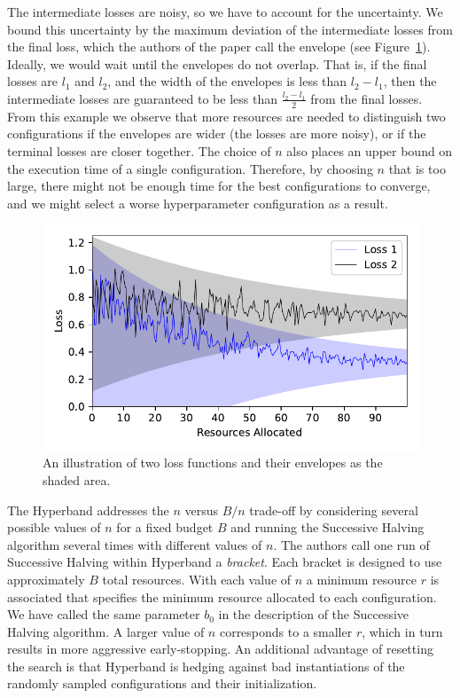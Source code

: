 The intermediate losses are noisy, so we have to account for the uncertainty. We bound this uncertainty by the maximum deviation of the intermediate losses from the final loss, which the authors of the paper call the envelope (see Figure~\ref{fig:envelopes}). Ideally, we would wait until the envelopes do not overlap. That is, if the final losses are $l_1$ and $l_2$, and the width of the envelopes is less than $l_2-l_1$, then the intermediate losses are guaranteed to be less than $\frac{l_2-l_1}{2}$ from the final losses. From this example we observe that more resources are needed to distinguish two configurations if the envelopes are wider (the losses are more noisy), or if the terminal losses are closer together. The choice of $n$ also places an upper bound on the execution time of a single configuration. Therefore, by choosing $n$ that is too large, there might not be enough time for the best configurations to converge, and we might select a worse hyperparameter configuration as a result.

\begin{figure}
    \centering
    \includegraphics[scale=0.75]{img/loss_envelopes.pdf}
    \caption{An illustration of two loss functions and their envelopes as the shaded area.}
    \label{fig:envelopes}
\end{figure}


The Hyperband addresses the $n$ versus $B/n$ trade-off by considering several possible values of $n$ for a fixed budget $B$ and running the Successive Halving algorithm several times with different values of $n$. The authors call one run of Successive Halving within Hyperband a \textit{bracket}. Each bracket is designed to use approximately $B$ total resources. With each value of $n$ a minimum resource $r$ is associated that specifies the minimum resource allocated to each configuration. We have called the same parameter $b_0$ in the description of the Successive Halving algorithm. A larger value of $n$ corresponds to a smaller $r$, which in turn results in more aggressive early-stopping. An additional advantage of resetting the search is that Hyperband is hedging against bad instantiations of the randomly sampled configurations and their initialization.

